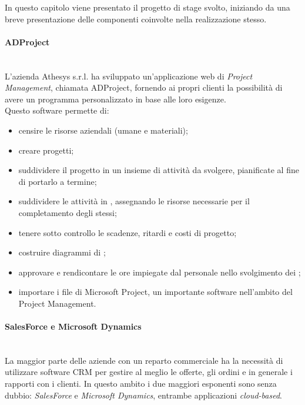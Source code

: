 \documentclass[12pt,a4paper,twoside,openany,english]{book}
\begin{document}
	In questo capitolo viene presentato il progetto di stage svolto, iniziando da una breve presentazione delle componenti coinvolte nella realizzazione stesso.
	
	\paragraph{ADProject}~\\
		L’azienda Athesys s.r.l. ha sviluppato un'applicazione web di \textit{Project Management}, chiamata ADProject, fornendo ai propri clienti la possibilità di avere un programma personalizzato in base alle loro esigenze.\\
		Questo software permette di:
		\begin{itemize}
			\itemsep-0.5em 
			\item censire le risorse aziendali (umane e materiali);
			\item creare progetti;
			\item suddividere il progetto in un insieme di attività da svolgere, pianificate al fine di portarlo a termine;
			\item suddividere le attività in , assegnando le risorse necessarie per il completamento degli stessi;
			\item tenere sotto controllo le scadenze, ritardi e costi di progetto;
			\item costruire diagrammi di ;
			\item approvare e rendicontare le ore impiegate dal personale nello svolgimento dei ;
			\item importare i file di Microsoft Project, un importante software nell'ambito del Project Management.
		\end{itemize} 
	\par
	
	\paragraph{SalesForce e Microsoft Dynamics}~\\
		La maggior parte delle aziende con un reparto commerciale ha la necessità di utilizzare software \gls{CRM} per gestire al meglio le offerte, gli ordini e in generale i rapporti con i clienti. In questo ambito i due maggiori esponenti sono senza dubbio: \textit{SalesForce} e \textit{Microsoft Dynamics}, entrambe applicazioni \textit{cloud-based}.
	\par
\end{document}
